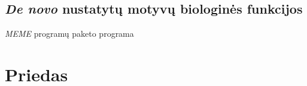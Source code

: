 \documentclass[12pt]{article}
\begin{document}
\subsection{\emph{De novo} nustatytų motyvų biologinės funkcijos}
\emph{MEME} programų paketo programa 

\newpage



\begin{thebibliography}{99}
\end{thebibliography}
\newpage


\section{Priedas}
\end{document}

